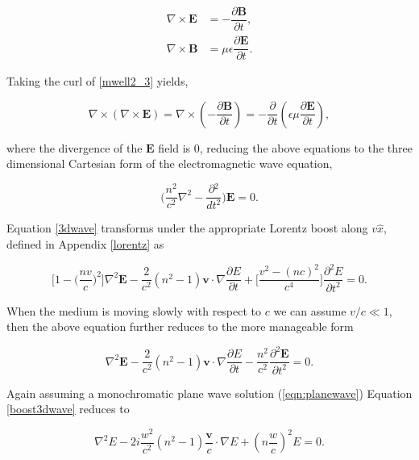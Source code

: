 \begin{align}
\nabla \times \bm{E} &= -\dfrac{\partial \bm{B}}{\partial t}, \label{mwell2_3}\\
\nabla \times \bm{B} &= \mu \epsilon \dfrac{\partial \bm{E}}{\partial t}.
\end{align}

Taking the curl of \ref{mwell2_3} yields,

\begin{equation}
\nabla \times (\nabla \times \bm{E}) = \nabla \times (-\dfrac{\partial \bm{B}}{\partial t}) = -\dfrac{\partial}{\partial t}(\epsilon \mu \dfrac{\partial \bm{E}}{\partial t}),
\end{equation}

where the divergence of the $\bm{E}$ field is $0$, reducing the above equations to the three dimensional Cartesian form of the electromagnetic wave equation,

\begin{equation}
\label{3dwave}
\big(\dfrac{n^2}{c^2} \nabla ^2 - \dfrac{\partial{^2}}{dt^2}\big)\bm{E} = 0.
\end{equation}

Equation \ref{3dwave} transforms under the appropriate Lorentz boost along $v\hat{x}$, defined in Appendix \ref{lorentz} as

\begin{equation}
\Big[1-\big(\dfrac{nv}{c}\big)^2 \Big] \nabla ^2 \bm{E} - \dfrac{2}{c^2} (n^2 - 1) \bm{v} \cdot \nabla \dfrac{\partial E}{\partial t} + \Big[\dfrac{v^2-(nc)^2}{c^4} \Big] \dfrac{\partial ^2 E}{\partial t^2} = 0.
\end{equation}

When the medium is moving slowly with respect to $c$ we can assume $v/c \ll 1$, then the above equation further reduces to the more manageable form

\begin{equation}
\label{boost3dwave}
\nabla ^2 \bm{E} - \dfrac{2}{c^2} (n^2 - 1) \bm{v} \cdot \nabla \dfrac{\partial E}{\partial t} - \dfrac{n^2}{c^2} \dfrac{\partial ^2 \bm{E}}{\partial t^2} = 0.
\end{equation}

Again assuming a monochromatic plane wave solution (\ref{eqn:planewave}) Equation \ref{boost3dwave} reduces to

\begin{equation}
\label{wavey}
\nabla ^2 E - 2i\dfrac{w^2}{c^2}(n^2-1)\dfrac{\bm{v}}{c} \cdot \nabla E + (n\dfrac{w}{c})^2 E = 0.
\end{equation}

